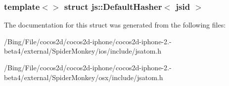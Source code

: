 \subsubsection*{template$<$$>$ struct js\-::\-Default\-Hasher$<$ jsid $>$}



The documentation for this struct was generated from the following files\-:\begin{DoxyCompactItemize}
\item 
/\-Bing/\-File/cocos2d/cocos2d-\/iphone/cocos2d-\/iphone-\/2.-\/beta4/external/\-Spider\-Monkey/ios/include/jsatom.\-h\item 
/\-Bing/\-File/cocos2d/cocos2d-\/iphone/cocos2d-\/iphone-\/2.-\/beta4/external/\-Spider\-Monkey/osx/include/jsatom.\-h\end{DoxyCompactItemize}
